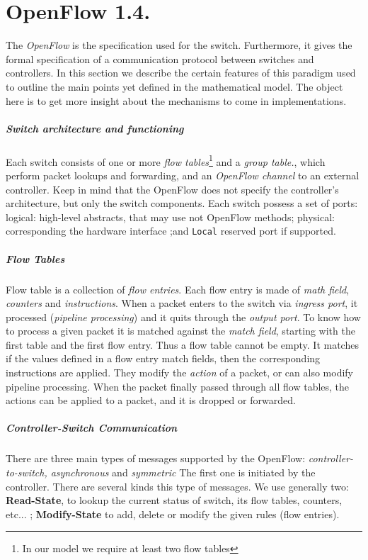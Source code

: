 \documentclass{article}
\theoremstyle{remark}
\begin{document}
\section{OpenFlow 1.4.}
The \emph{OpenFlow} is the specification used for the switch. Furthermore, it gives the formal specification of a communication protocol between switches and controllers. In this section we describe the certain features of this paradigm used to outline the main points yet defined in the mathematical model. The object here is to get more insight about the mechanisms to come in implementations.
\subparagraph{Switch architecture and functioning} Each switch consists of one or more \emph{flow tables}\footnote{In our model we require at least two flow tables} and a \emph{group table.}, which perform packet lookups and forwarding, and an \emph{OpenFlow channel} to an external controller\cite{OpenFlow}. Keep in mind that the OpenFlow does not specify the controller's architecture, but only the switch components. 
Each switch possess a set of ports: logical: high-level abstracts, that may use not OpenFlow methods; physical: corresponding the hardware interface ;and \texttt{Local} reserved port if supported. 
\subparagraph{Flow Tables} Flow table is a collection of \emph{flow entries}. Each flow entry is made of \emph{math field}, \emph{counters} and \emph{instructions}. When a packet enters to the switch via \emph{ingress port}, it processed (\emph{pipeline processing}) and it quits through the \emph{output port}.
To know how to process a given packet it is matched against the \emph{match field}, starting with the first table and the first flow entry. Thus a flow table cannot be empty. It matches if the values defined in a flow entry match fields, then the corresponding instructions are applied.  They modify the \emph{action} of a packet, or can also modify pipeline processing. When the packet finally passed through all flow tables, the actions can be applied to a packet, and it is dropped or forwarded. 
\subparagraph{Controller-Switch Communication} There are three main types of messages supported by the OpenFlow: \emph{controller-to-switch, asynchronous} and \emph{symmetric}
The first one is initiated by the controller. There are several kinds this type of messages. We use generally two: \textbf{Read-State}, to lookup the current status of switch, its flow tables, counters, etc... ; \textbf{Modify-State} to add, delete or modify the given rules (flow entries).
\end{document}
